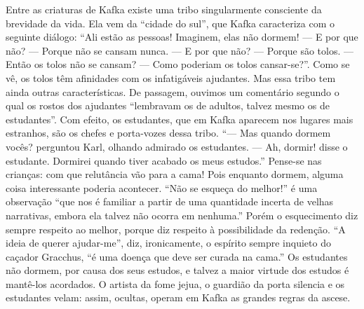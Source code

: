 Entre as criaturas de Kafka existe uma tribo singularmente consciente da
brevidade da vida. Ela vem da ``cidade do sul'', que Kafka caracteriza
com o seguinte diálogo: ``Ali estão as pessoas! Imaginem, elas não
dormem! --- E por que não? --- Porque não se cansam nunca. --- E por que
não? --- Porque são tolos. --- Então os tolos não se cansam? --- Como
poderiam os tolos cansar-se?''. Como se vê, os tolos têm afinidades com
os infatigáveis ajudantes. Mas essa tribo tem ainda outras
características. De passagem, ouvimos um comentário segundo o qual os
rostos dos ajudantes ``lembravam os de adultos, talvez mesmo os de
estudantes''. Com efeito, os estudantes, que em Kafka aparecem nos
lugares mais estranhos, são os chefes e porta-vozes dessa tribo. ``---
Mas quando dormem vocês? perguntou Karl, olhando admirado os estudantes.
--- Ah, dormir! disse o estudante. Dormirei quando tiver acabado os meus
estudos.'' Pense-se nas crianças: com que relutância vão para a cama!
Pois enquanto dormem, alguma coisa interessante poderia acontecer. ``Não
se esqueça do melhor!'' é uma observação ``que nos é familiar a partir
de uma quantidade incerta de velhas narrativas, embora ela talvez não
ocorra em nenhuma.'' Porém o esquecimento diz sempre respeito ao melhor,
porque diz respeito à possibilidade da redenção. ``A ideia de querer
ajudar-me'', diz, ironicamente, o espírito sempre inquieto do caçador
Gracchus, ``é uma doença que deve ser curada na cama.'' Os estudantes
não dormem, por causa dos seus estudos, e talvez a maior virtude dos
estudos é mantê-los acordados. O artista da fome jejua, o guardião da
porta silencia e os estudantes velam: assim, ocultas, operam em Kafka as
grandes regras da ascese.

